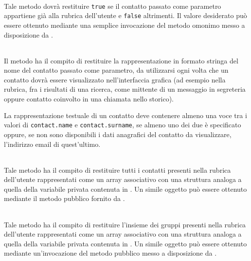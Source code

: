 \begin{description}

\item{}\\
Tale metodo dovrà restituire \verb'true' se il contatto passato come parametro appartiene già alla rubrica dell'utente e \verb'false' altrimenti. Il valore desiderato può essere ottenuto mediante una semplice invocazione del metodo omonimo messo a disposizione da .

\item{}\\
Il metodo ha il compito di restituire la rappresentazione in formato stringa del nome del contatto passato come parametro, da utilizzarsi ogni volta che un contatto dovrà essere visualizzato nell'interfaccia grafica (ad esempio nella rubrica, fra i risultati di una ricerca, come mittente di un messaggio in segreteria oppure contatto coinvolto in una chiamata nello storico).

La rappresentazione testuale di un contatto deve contenere almeno una voce tra i valori di \verb'contact.name' e \verb'contact.surname', se almeno uno dei due è specificato oppure, se non sono disponibili i dati anagrafici del contatto da visualizzare, l'indirizzo email di quest'ultimo.

\item{}\\
Tale metodo ha il compito di restituire tutti i contatti presenti nella rubrica dell'utente rappresentati come un array associativo con una struttura analoga a quella della variabile privata  contenuta in . Un simile oggetto può essere ottenuto mediante il metodo pubblico  fornito da .

\item{}\\
Tale metodo ha il compito di restituire l'insieme dei gruppi presenti nella rubrica dell'utente rappresentati come un array associativo con una struttura analoga a quella della variabile privata  contenuta in . Un simile oggetto può essere ottenuto mediante un'invocazione del metodo pubblico  messo a disposizione da .


\end{description}
